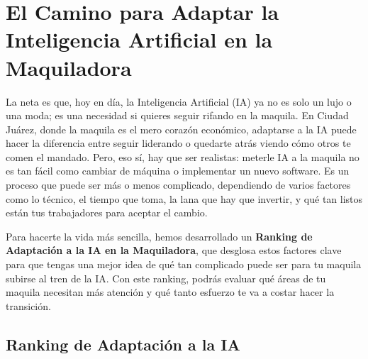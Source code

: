 \documentclass[
  10pt,
  letterpaper,
]{book}
\begin{document}
\section{El Camino para Adaptar la Inteligencia Artificial en la
Maquiladora}\label{el-camino-para-adaptar-la-inteligencia-artificial-en-la-maquiladora}

La neta es que, hoy en día, la Inteligencia Artificial (IA) ya no es
solo un lujo o una moda; es una necesidad si quieres seguir rifando en
la maquila. En Ciudad Juárez, donde la maquila es el mero corazón
económico, adaptarse a la IA puede hacer la diferencia entre seguir
liderando o quedarte atrás viendo cómo otros te comen el mandado. Pero,
eso sí, hay que ser realistas: meterle IA a la maquila no es tan fácil
como cambiar de máquina o implementar un nuevo software. Es un proceso
que puede ser más o menos complicado, dependiendo de varios factores
como lo técnico, el tiempo que toma, la lana que hay que invertir, y qué
tan listos están tus trabajadores para aceptar el cambio.

Para hacerte la vida más sencilla, hemos desarrollado un \textbf{Ranking
de Adaptación a la IA en la Maquiladora}, que desglosa estos factores
clave para que tengas una mejor idea de qué tan complicado puede ser
para tu maquila subirse al tren de la IA. Con este ranking, podrás
evaluar qué áreas de tu maquila necesitan más atención y qué tanto
esfuerzo te va a costar hacer la transición.

\subsection{Ranking de Adaptación a la
IA}\label{ranking-de-adaptaciuxf3n-a-la-ia}
\end{document}
